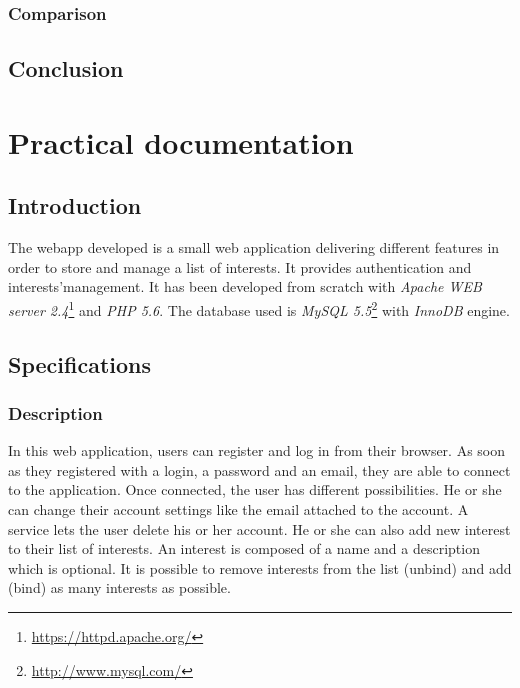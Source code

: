 \documentclass[a4paper,11pt,openany]{report}
\begin{document}
  \subsection{Comparison}
  
  
  
  \section{Conclusion}

  
  
\appendix
{}

\chapter{Practical documentation} \label{app:practical_documentation}

\section{Introduction}
The webapp developed is a small web application delivering different features 
in order to store and manage a list of interests. It provides authentication and 
interests'management. It has been developed from scratch with \textit{Apache 
WEB server 2.4}\footnote{\url{https://httpd.apache.org/}} and \textit{PHP 5.6}. 
The database used is \textit{MySQL 5.5}\footnote{\url{http://www.mysql.com/}} with 
\textit{InnoDB} engine.

\section{Specifications}

\subsection{Description}

In this web application, users can register and log in from their browser. As soon as 
they registered with a login, a password and an email, they are able to connect to 
the application. Once connected, the user has different possibilities. He or she can 
change their account settings like the email attached to the account. A service lets the 
user delete his or her account. He or she can also add new interest to their list of 
interests. An interest is composed of a name and a description which is optional. It is 
possible to remove interests from the list (unbind) and add (bind) as many interests as 
possible.
\end{document}
